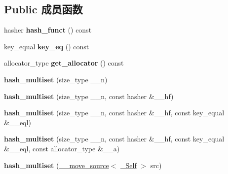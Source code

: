 \subsection*{Public 成员函数}
\begin{DoxyCompactItemize}
\item 
\mbox{\label{classhash__multiset_a2ede0bd579e38e436c235959a40abeca}} 
hasher {\bfseries hash\+\_\+funct} () const
\item 
\mbox{\label{classhash__multiset_a01588d1227428fe1de41d40c7e6b9ada}} 
key\+\_\+equal {\bfseries key\+\_\+eq} () const
\item 
\mbox{\label{classhash__multiset_a80a7c28d5f4aa2da9258ec9935d31a2c}} 
allocator\+\_\+type {\bfseries get\+\_\+allocator} () const
\item 
\mbox{\label{classhash__multiset_aca5878efc3a45ca03c31a5a94582b695}} 
{\bfseries hash\+\_\+multiset} (size\+\_\+type \+\_\+\+\_\+n)
\item 
\mbox{\label{classhash__multiset_a2997dad82639a8a03b6b39df2f103951}} 
{\bfseries hash\+\_\+multiset} (size\+\_\+type \+\_\+\+\_\+n, const hasher \&\+\_\+\+\_\+hf)
\item 
\mbox{\label{classhash__multiset_ac7c6220deda79839f890833a758aba98}} 
{\bfseries hash\+\_\+multiset} (size\+\_\+type \+\_\+\+\_\+n, const hasher \&\+\_\+\+\_\+hf, const key\+\_\+equal \&\+\_\+\+\_\+eql)
\item 
\mbox{\label{classhash__multiset_a03ff853f6d3588e296b63d9e3e432296}} 
{\bfseries hash\+\_\+multiset} (size\+\_\+type \+\_\+\+\_\+n, const hasher \&\+\_\+\+\_\+hf, const key\+\_\+equal \&\+\_\+\+\_\+eql, const allocator\+\_\+type \&\+\_\+\+\_\+a)
\item 
\mbox{\label{classhash__multiset_a5068fa87e3843d3dc9569cfd9266add7}} 
{\bfseries hash\+\_\+multiset} (\hyperlink{class____move__source}{\+\_\+\+\_\+move\+\_\+source}$<$ \hyperlink{classhash__multiset}{\+\_\+\+Self} $>$ src)
\item 
\mbox{\label{classhash__multiset_ad54866e11522fdb711d759e3ede8f1fb}} 

\end{DoxyCompactItemize}

